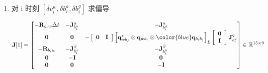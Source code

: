 \documentclass[12pt,a4paper]{article}
\begin{document}
\begin{enumerate}
\begin{enumerate}
\begin{equation}
\mathbf{J}[0]=
\begin{bmatrix}
-\mathbf{R}_{b_{i} w} & \left[\mathbf{R}_{b_{i} w}\left(\mathbf{p}_{w b_{j}}-\mathbf{p}_{w b_{i}}-\mathbf{v}_{i}^{w} \Delta t+\frac{1}{2} \mathbf{g}^{w} \Delta t^{2}\right)\right]_{\times} \\
\mathbf{0} & -\left[\begin{array}{ll}{\mathbf{0}} & {\mathbf{I}}\end{array}\right]\left[\mathbf{q}_{w b_{j}}^{*} \otimes \mathbf{q}_{w b_{i}}\right]_{L}\left[{\color{blue}\mathbf{q}_{b_{i} b_{j}}}\right]_{R}\left[\begin{array}{c}{\mathbf{0}} \\ {\mathbf{I}}\end{array}\right] \\
\mathbf{0} & \left[\mathbf{R}_{b_{i} w}\left(\mathbf{v}_{j}^{w}-\mathbf{v}_{i}^{w}+\mathbf{g}^{w} \Delta t\right)\right]_{\times} \\
\mathbf{0} & \mathbf{0}  \\
\mathbf{0} & \mathbf{0} 
\end{bmatrix}
\in \mathbb{R}^{15 \times 7}
\end{equation}

\item 对 {\color{blue}i 时刻 $[\delta v^{w}_{i},\delta b^a_{i},\delta b^g_{i}]$} 求偏导

\begin{equation}
\mathbf{J}[1]=
\begin{bmatrix}
-\mathbf{R}_{b_{i} w} \Delta t & -\mathbf{J}_{b_{i}^{a}}^{\alpha} & -\mathbf{J}_{b_{i}^{g}}^{\alpha} \\
\mathbf{0} & \mathbf{0} & -\left[\begin{array}{ll}{\mathbf{0}} & {\mathbf{I}}\end{array}\right]\left[\mathbf{q}_{w b_{j}}^{*} \otimes \mathbf{q}_{w b_{i}} \otimes {\color{blue}\mathbf{q}_{b_{i} b_{j}}}\right]_{L}\left[\begin{array}{c}{\mathbf{0}} \\ \mathbf{I}\end{array}\right] \mathbf{J}_{b_{i}^{g}}^{q} \\
-\mathbf{R}_{b_{i} w} & -\mathbf{J}_{b_{i}^{a}}^{\beta} & -\mathbf{J}_{b_{i}^{g}}^{\beta} \\
\mathbf{0} & -\mathbf{I}  &  \mathbf{0} \\
\mathbf{0} &  \mathbf{0}  & -\mathbf{I}
\end{bmatrix}
\in \mathbb{R}^{15 \times 9}
\end{equation}


\end{enumerate}
\end{enumerate}
\end{document}
